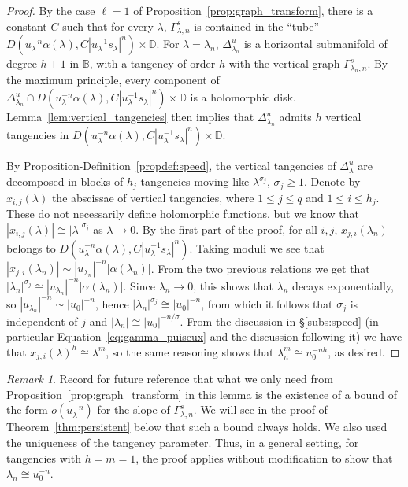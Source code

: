 \documentclass[11pt, oneside]{amsart}
\newcommand{\B}{\mathbb{B}}
\newcommand{\D}{\mathbb{D}}
\newcommand{\abs}[1]{\left\vert#1\right\vert}
\theoremstyle{remark}
\newtheorem{rmk}[prop]{Remark}
\theoremstyle{definition}
\theoremstyle{theorem}
\newcommand{\commentaire}[1]{}
\begin{document}
\begin{proof}
By the case $\ell=1$ of 
Proposition~\ref{prop:graph_transform},  there is a constant $C$ such that for every $\lambda$, 
$\Gamma^s_{\lambda, n} $ is contained in the ``tube'' 
$D(u_\lambda^{-n} \alpha(\lambda), C\abs{u_\lambda^{-1} s_\lambda }^n)\times \D$.  
For $\lambda = \lambda_n$, 
$\Delta^u_{\lambda_n}$ is a  horizontal submanifold 
of degree $h+1$ in $\B$, with a tangency of order $h$ with the vertical graph 
$\Gamma^s_{\lambda_n, n}$. By the maximum principle, every component 
of $\Delta^u_{\lambda_n}\cap 
D(u_\lambda^{-n} \alpha(\lambda), C\abs{u_\lambda^{-1} s_\lambda }^n)\times \D$ 
is a holomorphic disk. Lemma~\ref{lem:vertical_tangencies} then implies that 
 $\Delta^u_{\lambda_n}$ admits $h$ vertical tangencies in 
 $D(u_\lambda^{-n} \alpha(\lambda), C\abs{u_\lambda^{-1} s_\lambda }^n)\times \D$.


By Proposition-Definition~\ref{propdef:speed}, the vertical tangencies of $\Delta^u_{\lambda}$ are decomposed in blocks of $h_j$ tangencies 
moving like $\lambda^{\sigma_j}$, $\sigma_j\geq 1$. Denote by $x_{i, j}(\lambda)$ the abscissae of 
vertical tangencies, where  $1\leq j\leq q$ and  $ 1\leq i\leq h_j$. 
These do not necessarily define holomorphic functions, but we know that 
$\abs{ x_{i, j}(\lambda)}\cong \abs{\lambda}^{\sigma_j}$ as $\lambda\to 0$. 
By the first part of the proof, for all $i,j$, $x_{j, i}(\lambda_n)$
belongs to $D(u_\lambda^{-n} \alpha(\lambda), C\abs{u_\lambda^{-1} s_\lambda }^n)$. 
Taking moduli we see 
that $\abs{x_{j, i}(\lambda_n)}\sim \abs{u_{\lambda_n}}^{-n}  \abs{\alpha(\lambda_n)}$.
From the two previous relations we get that 
$\abs{\lambda_n}^{\sigma_j}\cong \abs{u_{\lambda_n}}^{-n}  \abs{\alpha(\lambda_n)}$. Since $\lambda_n\to 0$, this shows that $\lambda_n$ decays exponentially, so 
$\abs{u_{\lambda_n}}^{-n}\sim \abs{u_0}^{-n}$, hence 
$\abs{\lambda_n}^{\sigma_j}\cong  \abs{u_0}^{-n}$, from which it follows that 
$\sigma_j$ is independent of $j$ and $\abs{\lambda_n} \cong  \abs{u_0}^{-n/\sigma}$.
 From the discussion in \S\ref{subs:speed} (in particular Equation~\eqref{eq:gamma_puiseux} and the discussion following it) we have that $x_{j, i}(\lambda)^h\cong \lambda^m$, so the same reasoning 
 shows that $\lambda_n^m\cong u_0^{-nh}$, as desired. 
\end{proof}

\begin{rmk}\label{rmk:similarity} \commentaire{New remark related to Major remark \#3 and minor comment \#11}
Record for future reference that what we only 
need from Proposition~\ref{prop:graph_transform} in this lemma is the existence of a bound of the form 
$o(u_\lambda^{-n})$ for the slope of $\Gamma^s_{\lambda,n}$. We will see in the proof of Theorem~\ref{thm:persistent} below that such a bound always holds. 
We also used the uniqueness of the tangency parameter. 
Thus, in a general setting, 
for tangencies with $h=m=1$, the proof applies without modification to show  that 
$\lambda_n\cong u_0^{-n}$. 
\end{rmk}
\end{document}
